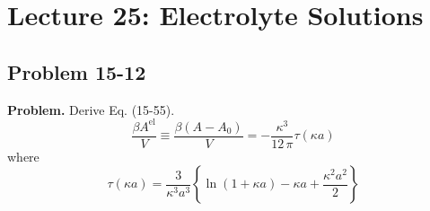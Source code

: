 \documentclass[twocolumn, 10pt]{article}
\numberwithin{equation}{section}
\newenvironment{problem}
{\par\medskip \color{problemblue}
  \textbf{Problem. }\ignorespaces}
{\medskip}
\begin{document}
\section{Lecture 25: Electrolyte Solutions}

\subsection{Problem 15-12}

\begin{problem}
  Derive Eq. (15-55).
  \begin{equation}
    \frac{ \beta A^\mathrm{el} } { V }
    \equiv
    \frac{ \beta (A - A_0) } { V }
    =
    -\frac{ \kappa^3 } { 12 \, \pi }
    \tau(\kappa a)
    \tag{15-55}
  \end{equation}
  where
  \begin{equation}
    \tau(\kappa a)
    =
    \frac{3}{\kappa^3 a^3}
    \left\{
      \ln(1 + \kappa a)
      -\kappa a
      + \frac{ \kappa^2 a^2 } { 2}
    \right\}
    \tag{15-56}
  \end{equation}
\end{problem}
\end{document}
